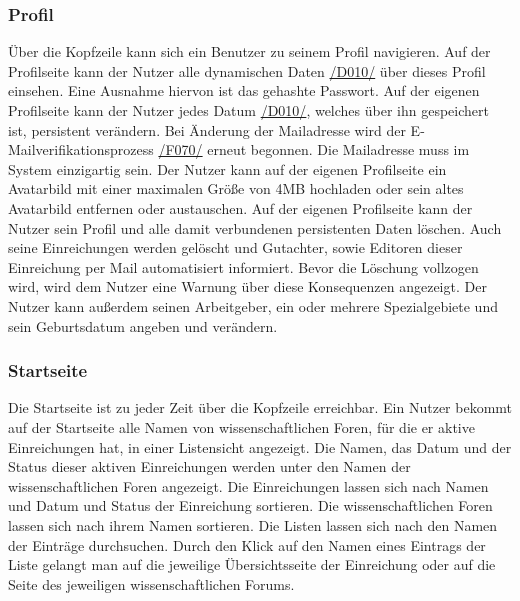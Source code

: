\subsubsection{Profil}
\begin{description}
     Über die Kopfzeile kann sich ein Benutzer zu seinem Profil navigieren.
     Auf der Profilseite kann der Nutzer alle dynamischen Daten \hyperref[d010]{/D010/} über dieses Profil einsehen.
    Eine Ausnahme hiervon ist das gehashte Passwort.
     Auf der eigenen Profilseite kann der Nutzer jedes Datum \hyperref[d010]{/D010/},
    welches über ihn gespeichert ist, persistent verändern.
     Bei Änderung der Mailadresse wird der E-Mailverifikationsprozess \hyperref[funkt:070]{/F070/} erneut
    begonnen. Die Mailadresse muss im System einzigartig sein.
     Der Nutzer kann auf der eigenen Profilseite ein Avatarbild mit einer maximalen
    Größe von 4MB hochladen oder sein altes Avatarbild entfernen oder austauschen. %
     Auf der eigenen Profilseite kann der Nutzer sein Profil und alle damit verbundenen persistenten
    Daten löschen. Auch seine Einreichungen werden gelöscht und Gutachter, sowie Editoren dieser
    Einreichung per Mail automatisiert informiert. Bevor die Löschung vollzogen wird, wird dem Nutzer
    eine Warnung über diese Konsequenzen angezeigt.
     Der Nutzer kann außerdem seinen Arbeitgeber, ein oder mehrere Spezialgebiete
    und sein Geburtsdatum angeben und verändern.
\end{description}

\subsubsection{Startseite}
\begin{description}
     Die Startseite ist zu jeder Zeit über die Kopfzeile erreichbar.
     Ein Nutzer bekommt auf der Startseite alle Namen von wissenschaftlichen Foren,
    für die er aktive Einreichungen hat, in einer Listensicht angezeigt.
    Die Namen, das Datum und der Status dieser aktiven Einreichungen werden unter den Namen der wissenschaftlichen
    Foren angezeigt.
     Die Einreichungen lassen sich nach Namen und Datum und Status
    der Einreichung sortieren. Die wissenschaftlichen Foren lassen sich nach ihrem Namen sortieren.
     Die Listen lassen sich nach den Namen der Einträge durchsuchen.
     Durch den Klick auf den Namen eines Eintrags der Liste gelangt man auf die jeweilige Übersichtsseite
    der Einreichung oder auf die Seite des jeweiligen wissenschaftlichen Forums.
\end{description}

